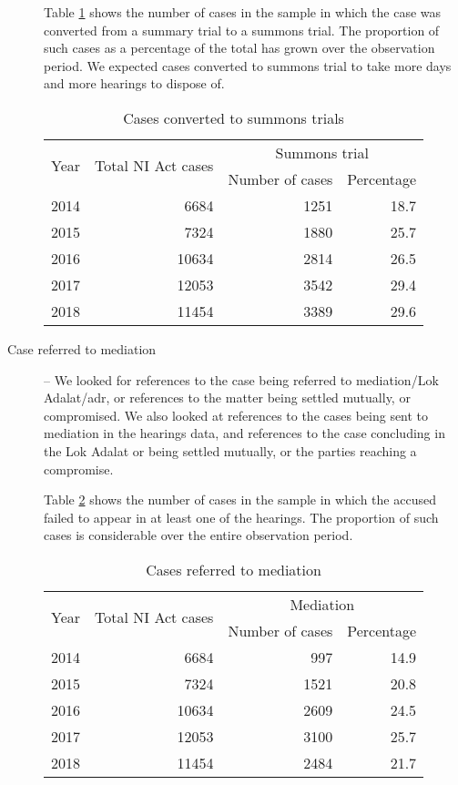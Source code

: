 \documentclass[12pt,a4paper]{article}
\begin{document}
\begin{description}
		Table \ref{tab:summons_yearWise} shows the number of cases in the sample in which the case was converted from a summary trial to a summons trial. The proportion of such cases as a percentage of the total has grown over the observation period. We expected cases converted to summons trial to take more days and more hearings to dispose of.
		
		\begin{table}[!ht]
			\caption{Cases converted to summons trials}\label{tab:summons_yearWise}
			\centering
			\footnotesize
			\begin{tabular}{@{}lrrr@{}}
				
				\toprule
				\multirow{2}{*}{Year} & \multirow{2}{*}{Total NI Act cases} & \multicolumn{2}{c}{Summons trial}\\
				\cmidrule{3-4}
				&& Number of cases & Percentage \\
				\midrule%
				2014 & 6684 & 1251 & 18.7 \\
				2015 & 7324 & 1880 & 25.7 \\
				2016 & 10634 & 2814 & 26.5 \\
				2017 & 12053 & 3542 & 29.4 \\
				2018 & 11454 & 3389 & 29.6 \\
				\bottomrule
			\end{tabular}
		\end{table}
		
		\item [Case referred to mediation] -- We looked for references to the case being referred to mediation/Lok Adalat/\gls{adr}, or references to the matter being settled mutually, or compromised. We also looked at references to the cases being sent to mediation in the hearings data, and references to the case concluding in the Lok Adalat or being settled mutually, or the parties reaching a compromise.
		
		Table \ref{tab:mediation_yearWise} shows the number of cases in the sample in which the accused failed to appear in at least one of the hearings. The proportion of such cases is considerable over the entire observation period.
		
		\begin{table}[!ht]
			\caption{Cases referred to mediation}\label{tab:mediation_yearWise}
			\centering
			\footnotesize
			\begin{tabular}{lrrr}
				\toprule
				\multirow{2}{*}{Year} & \multirow{2}{*}{Total NI Act cases} & \multicolumn{2}{c}{Mediation}\\
				\cmidrule{3-4}
				&& Number of cases & Percentage \\
				\midrule%
				2014 & 6684 & 997 & 14.9 \\
				2015 & 7324 & 1521 & 20.8 \\
				2016 & 10634 & 2609 & 24.5 \\
				2017 & 12053 & 3100 & 25.7 \\
				2018 & 11454 & 2484 & 21.7 \\
				\bottomrule
			\end{tabular}
		\end{table}
		

\end{description}
\end{document}
